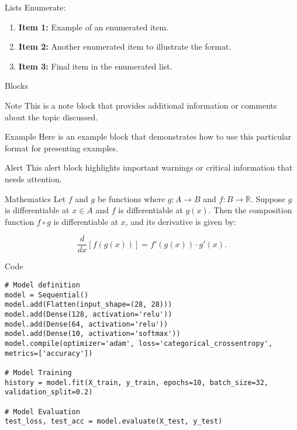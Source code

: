 \documentclass[12pt]{beamer}
\begin{document}
\begin{frame}[allowframebreaks]{Lists}
	Enumerate:

	\begin{enumerate}
		\item \textbf{Item 1:} Example of an enumerated item.
		\item \textbf{Item 2:} Another enumerated item to illustrate the format.
		\item \textbf{Item 3:} Final item in the enumerated list.
	\end{enumerate}
\end{frame}

\begin{frame}[allowframebreaks]{Blocks}
	\begin{block}{Note}
		This is a note block that provides additional information or comments about the topic discussed.
	\end{block}

	\begin{exampleblock}{Example}
		Here is an example block that demonstrates how to use this particular format for presenting examples.
	\end{exampleblock}

	\begin{alertblock}{Alert}
		This alert block highlights important warnings or critical information that needs attention.
	\end{alertblock}
\end{frame}

\begin{frame}[allowframebreaks]{Mathematics}
	Let $f$ and $g$ be functions where $g: A \to B$ and $f: B \to \mathbb{R}$. Suppose $g$ is differentiable at $x \in A$ and $f$ is differentiable at $g(x)$. Then the composition function $f \circ g$ is differentiable at $x$, and its derivative is given by:

	\begin{equation}
		\frac{d}{dx} \left[ f(g(x)) \right] = f'(g(x)) \cdot g'(x).
		\label{eq:1}
	\end{equation}
\end{frame}

\begin{frame}{Code}
	\lstset{style=py}
	\begin{lstlisting}
# Model definition
model = Sequential()
model.add(Flatten(input_shape=(28, 28)))
model.add(Dense(128, activation='relu'))
model.add(Dense(64, activation='relu'))
model.add(Dense(10, activation='softmax'))
model.compile(optimizer='adam', loss='categorical_crossentropy', metrics=['accuracy'])

# Model Training
history = model.fit(X_train, y_train, epochs=10, batch_size=32, validation_split=0.2)

# Model Evaluation
test_loss, test_acc = model.evaluate(X_test, y_test)
\end{lstlisting}
\end{frame}
\end{document}
